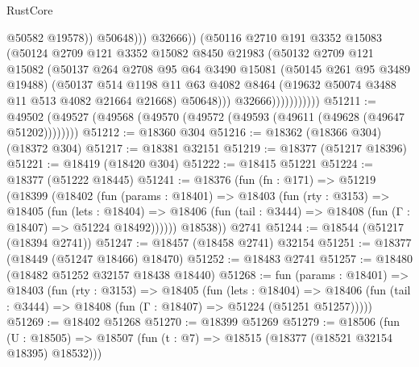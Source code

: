 \begin{lexlean}{RustCore}
\begin{coremodule}
                                    @50582
                                    @19578))
                                @50648)))
                          @32666))
                      (@50116
                        @2710
                        @191
                        @3352
                        @15083
                        (@50124
                          @2709
                          @121
                          @3352
                          @15082
                          @8450
                          @21983
                          (@50132
                            @2709
                            @121
                            @15082
                            (@50137
                              @264
                              @2708
                              @95
                              @64
                              @3490
                              @15081
                              (@50145 @261 @95 @3489 @19488)
                              (@50137
                                @514
                                @1198
                                @11
                                @63
                                @4082
                                @8464
                                (@19632 @50074 @3488 @11 @513 @4082 @21664 @21668)
                                @50648)))
                          @32666)))))))))))
@51211 := @49502 (@49527 (@49568 (@49570 (@49572 (@49593 (@49611 (@49628 (@49647 @51202))))))))
@51212 := @18360 @304
@51216 := @18362 (@18366 @304) (@18372 @304)
@51217 := @18381 @32151
@51219 := @18377 (@51217 @18396)
@51221 := @18419 (@18420 @304)
@51222 := @18415 @51221
@51224 := @18377 (@51222 @18445)
@51241 := @18376
    (fun (fn : @171) =>
    @51219
      (@18399
        (@18402
          (fun (params : @18401) =>
          @18403
            (fun (rty : @3153) =>
            @18405
              (fun (lets : @18404) =>
              @18406 (fun (tail : @3444) => @18408 (fun (Γ : @18407) => @51224 @18492))))))
        @18538))
    @2741
@51244 := @18544 (@51217 (@18394 @2741))
@51247 := @18457 (@18458 @2741) @32154
@51251 := @18377 (@18449 (@51247 @18466) @18470)
@51252 := @18483 @2741
@51257 := @18480 (@18482 @51252 @32157 @18438 @18440)
@51268 := fun (params : @18401) =>
  @18403
    (fun (rty : @3153) =>
    @18405
      (fun (lets : @18404) =>
      @18406 (fun (tail : @3444) => @18408 (fun (Γ : @18407) => @51224 (@51251 @51257)))))
@51269 := @18402 @51268
@51270 := @18399 @51269
@51279 := @18506
    (fun (U : @18505) => @18507 (fun (t : @7) => @18515 (@18377 (@18521 @32154 @18395) @18532)))

\end{coremodule}
\end{lexlean}
